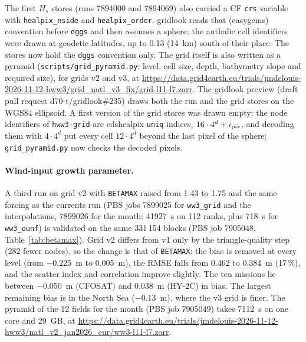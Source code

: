 \documentclass[11pt,a4paper]{article}
\begin{document}
The first $H_s$ stores (runs 7894000 and 7894069) also carried a CF
\texttt{crs} variable with \texttt{healpix\_nside} and
\texttt{healpix\_order}. gridlook reads that (easygems) convention before
\texttt{dggs} and then assumes a sphere: the authalic cell identifiers were
drawn at geodetic latitudes, up to 0.13\textdegree{} (\SI{14}{km}) south of
their place. The stores now hold the \texttt{dggs} convention only. The
grid itself is also written as a pyramid (\texttt{scripts/grid\_pyramid.py}:
level, cell size, depth, bathymetry slope and required size), for grids v2
and v3, at
\url{https://data.grid4earth.eu/trials/jmdelouis-2026-11-12-hww3/grid_natl_v3_fix/grid-l11-l7.zarr}.
The gridlook preview (draft pull request d70-t/gridlook\#235) draws both
the run and the grid stores on the WGS84 ellipsoid. A first version of the
grid stores was drawn empty: the node identifiers of \texttt{hww3-grid} are
cdshealpix \texttt{uniq} indices, $16\cdot4^d + i_{\rm pix}$, and decoding
them with $4\cdot4^d$ put every cell $12\cdot4^d$ beyond the last pixel of
the sphere; \texttt{grid\_pyramid.py} now checks the decoded pixels.

\paragraph{Wind-input growth parameter.} A third run on grid v2 with
\texttt{BETAMAX} raised from 1.43 to 1.75 and the same forcing as the
currents run (PBS jobs 7899025 for \texttt{ww3\_grid} and the
interpolations, 7899026 for the month: \SI{41927}{s} on 112 ranks, plus
\SI{718}{s} for \texttt{ww3\_ounf}) is validated on the same 331\,154
blocks (PBS job 7905048, Table~\ref{tab:betamax}). Grid v2 differs from v1
only by the triangle-quality step (282 fewer nodes), so the change is that
of \texttt{BETAMAX}: the bias is removed at every level (from
\SI{-0.225}{m} to \SI{+0.005}{m}), the RMSE falls from 0.462 to
\SI{0.384}{m} (17\,\%), and the scatter index and correlation improve
slightly. The ten missions lie between \SI{-0.050}{m} (CFOSAT) and
\SI{+0.038}{m} (HY-2C) in bias. The largest remaining bias is in the North
Sea (\SI{-0.13}{m}), where the v3 grid is finer. The pyramid of the 12
fields for the month (PBS job 7905049) takes \SI{7112}{s} on one core and
\SI{29}{GB}, at
\url{https://data.grid4earth.eu/trials/jmdelouis-2026-11-12-hww3/natl_v2_jan2026_cur/ww3-l11-l7.zarr}.
\end{document}
